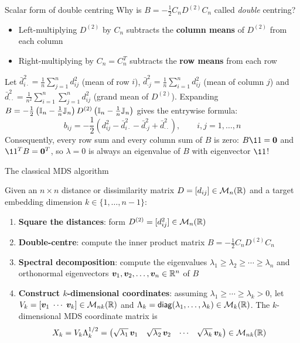 \documentclass[aspectratio=169]{beamer}\usepackage[]{graphicx}\usepackage[]{xcolor}
\begin{document}
\begin{frame}{Scalar form of double centring}
Why is $B = -\frac{1}{2}C_n D^{(2)} C_n$ called \emph{double} centring?
\vfill
\begin{itemize}
\item Left-multiplying $D^{(2)}$ by $C_n$ subtracts the \textbf{column means} of $D^{(2)}$ from each column
\item Right-multiplying by $C_n = C_n^T$ subtracts the \textbf{row means} from each row
\end{itemize}
\vfill
Let $\bar{d}_{i\cdot}^2 = \frac{1}{n}\sum_{j=1}^n d_{ij}^2$ (mean of row $i$), $\bar{d}_{\cdot j}^2 = \frac{1}{n}\sum_{i=1}^n d_{ij}^2$ (mean of column $j$) and $\bar{d}_{\cdot\cdot}^2 = \frac{1}{n^2}\sum_{i=1}^n\sum_{j=1}^n d_{ij}^2$ (grand mean of $D^{(2)}$). Expanding $B = -\frac{1}{2}\left(\mathbb{I}_n - \frac{1}{n}\mathbb{J}_n\right)D^{(2)}\left(\mathbb{I}_n - \frac{1}{n}\mathbb{J}_n\right)$ gives the entrywise formula:
\[
b_{ij} = -\frac{1}{2}\left(d_{ij}^2 - \bar{d}_{i\cdot}^2 - \bar{d}_{\cdot j}^2 + \bar{d}_{\cdot\cdot}^2\right), \qquad i,j=1,\ldots,n
\]
\vfill
Consequently, every row sum and every column sum of $B$ is zero: $B\11 = \b0$ and $\11^T B = \b0^T$, so $\lambda = 0$ is always an eigenvalue of $B$ with eigenvector $\11$!
\end{frame}



\begin{frame}{The classical MDS algorithm}
\begin{importantdefinition}
Given an $n\times n$ distance or dissimilarity matrix $D = [d_{ij}]\in\mathcal{M}_n(\mathbb{R})$ and a target embedding dimension $k\in\{1,\ldots,n-1\}$:
\begin{enumerate}
\item \textbf{Square the distances}: form $D^{(2)} = [d_{ij}^2]\in\mathcal{M}_n(\mathbb{R})$
\item \textbf{Double-centre}: compute the inner product matrix $B = -\frac{1}{2} C_n D^{(2)} C_n$
\item \textbf{Spectral decomposition}: compute the eigenvalues $\lambda_1 \ge \lambda_2 \ge \cdots \ge \lambda_n$ and orthonormal eigenvectors $\bm{v}_1,\bm{v}_2,\ldots,\bm{v}_n\in\mathbb{R}^n$ of $B$
\item \textbf{Construct $k$-dimensional coordinates}: assuming $\lambda_1 \ge \cdots \ge \lambda_k > 0$, let $V_k = [\bm{v}_1 \;\cdots\; \bm{v}_k]\in\mathcal{M}_{nk}(\mathbb{R})$ and $\Lambda_k = \mathsf{diag}(\lambda_1,\ldots,\lambda_k)\in\mathcal{M}_k(\mathbb{R})$. The $k$-dimensional MDS coordinate matrix is
\[
X_k = V_k \Lambda_k^{1/2} = \begin{pmatrix} \sqrt{\lambda_1}\,\bm{v}_1 & \sqrt{\lambda_2}\,\bm{v}_2 & \cdots & \sqrt{\lambda_k}\,\bm{v}_k \end{pmatrix} \in \mathcal{M}_{nk}(\mathbb{R})
\]
\end{enumerate}
\end{importantdefinition}
\end{frame}
\end{document}

